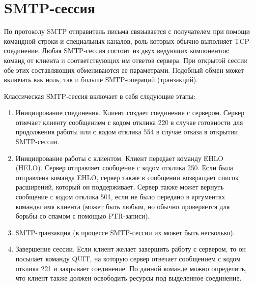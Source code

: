 \documentclass[a4paper,12pt]{report}
\begin{document}
	\section{SMTP-сессия}
	
	По протоколу SMTP отправитель письма связывается с получателем при помощи командной строки и специальных каналов, роль которых обычно выполняет TCP-соединение. Любая SMTP-сессия состоит из двух ведующих компонентов: команд от клиента и соответствующих им ответов сервера. При открытой сессии обе этих составляющих обмениваются ее параметрами. Подобный обмен может включать как ноль, так и больше SMTP-операций (транзакций).

	Классическая SMTP-сессия включает в себя следующие этапы:
	\begin{enumerate}
		\item Инициирование соединения. Клиент создает соединение с сервером. Сервер отвечает клиенту сообщением с кодом отклика 220 в случае готовности для продолжения работы или с кодом отклика 554 в случае отказа в открытии SMTP-сессии.
		\item Инициирование работы с клиентом. Клиент передает команду EHLO (HELO). Сервер отправляет сообщение с кодом отклика 250. Если была отправлена команда EHLO, сервер также в сообщении возвращает список расширений, который он поддерживает. Сервер также может вернуть сообщение с кодом отклика 501, если не было передано в аргументах команды имя клиента (может быть любым, но обычно проверяется для борьбы со спамом с помощью PTR-записи).
		\item SMTP-транзакция (в процессе SMTP-сессии их может быть несколько).
		\item Завершение сессии. Если клиент желает завершить работу с сервером, то он посылает команду QUIT, на которую сервер отвечает сообщением с кодом отклика 221 и закрывает соединение. По данной команде можно определить, что клиент также должен освободить ресурсы под выделенное соединение.
	\end{enumerate}
\end{document}
